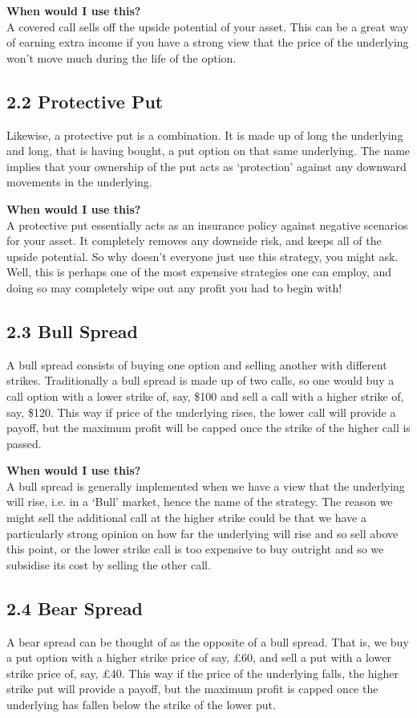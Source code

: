 \documentclass[11pt]{article}
\begin{document}
\textbf{When would I use this?} \\ 
A covered call sells off the upside potential of your asset. This can be a great way of earning extra income if you have a strong view that the price of the underlying won't move much during the life of the option.

\subsection*{2.2 Protective Put}
Likewise, a protective put is a combination. It is made up of long the underlying and long, that is having bought, a put option on that same underlying. The name implies that your ownership of the put acts as `protection' against any downward movements in the underlying.

\textbf{When would I use this?} \\ 
A protective put essentially acts as an insurance policy against negative scenarios for your asset. It completely removes any downside risk, and keeps all of the upside potential. So why doesn't everyone just use this strategy, you might ask. Well, this is perhaps one of the most expensive strategies one can employ, and doing so may completely wipe out any profit you had to begin with!

\subsection*{2.3 Bull Spread}
A bull spread consists of buying one option and selling another with different strikes. Traditionally a bull spread is made up of two calls, so one would buy a call option with a lower strike of, say, \$100 and sell a call with a higher strike of, say, \$120. This way if price of the underlying rises, the lower call will provide a payoff, but the maximum profit will be capped once the strike of the higher call is passed.

\textbf{When would I use this?} \\ 
A bull spread is generally implemented when we have a view that the underlying will rise, i.e. in a `Bull' market, hence the name of the strategy. The reason we might sell the additional call at the higher strike could be that we have a particularly strong opinion on how far the underlying will rise and so sell above this point, or the lower strike call is too expensive to buy outright and so we subsidise its cost by selling the other call. 

\subsection*{2.4 Bear Spread}
A bear spread can be thought of as the opposite of a bull spread. That is, we buy a put option with a higher strike price of say, £60, and sell a put with a lower strike price of, say, £40. This way if the price of the underlying falls, the higher strike put will provide a payoff, but the maximum profit is capped once the underlying has fallen below the strike of the lower put. 
\end{document}
